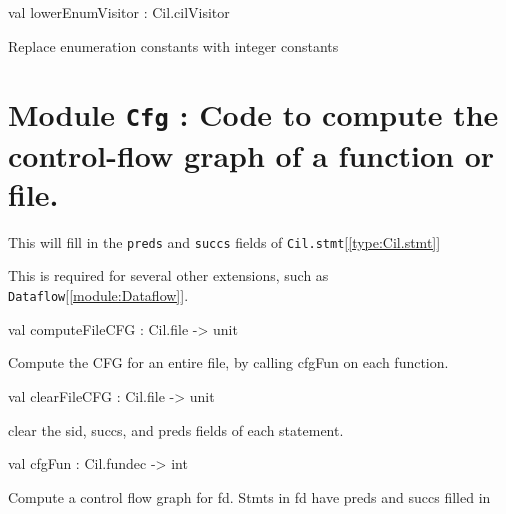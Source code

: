 \documentclass[11pt]{article}
\begin{document}
\ocamldocvspace{0.5cm}



\label{val:Cillower.lowerEnumVisitor}\begin{ocamldoccode}
val lowerEnumVisitor : Cil.cilVisitor
\end{ocamldoccode}
\begin{ocamldocdescription}
Replace enumeration constants with integer constants


\end{ocamldocdescription}


\section{Module {\tt{Cfg}} : Code to compute the control-flow graph of a function or file.}
\label{module:Cfg}
  
  This will fill in the {\tt{preds}} and {\tt{succs}} fields of {\tt{Cil.stmt}}[\ref{type:Cil.stmt}]


  This is required for several other extensions, such as {\tt{Dataflow}}[\ref{module:Dataflow}].



\ocamldocvspace{0.5cm}



\label{val:Cfg.computeFileCFG}\begin{ocamldoccode}
val computeFileCFG : Cil.file -> unit
\end{ocamldoccode}
\begin{ocamldocdescription}
Compute the CFG for an entire file, by calling cfgFun on each function.


\end{ocamldocdescription}




\label{val:Cfg.clearFileCFG}\begin{ocamldoccode}
val clearFileCFG : Cil.file -> unit
\end{ocamldoccode}
\begin{ocamldocdescription}
clear the sid, succs, and preds fields of each statement.


\end{ocamldocdescription}




\label{val:Cfg.cfgFun}\begin{ocamldoccode}
val cfgFun : Cil.fundec -> int
\end{ocamldoccode}
\begin{ocamldocdescription}
Compute a control flow graph for fd.  Stmts in fd have preds and succs
  filled in


\end{ocamldocdescription}
\end{document}
